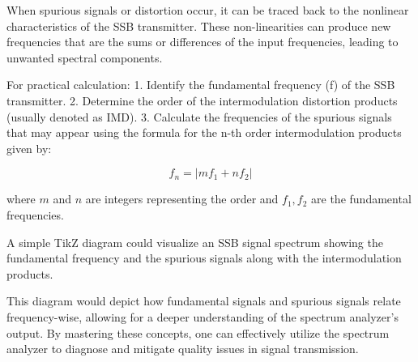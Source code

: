 When spurious signals or distortion occur, it can be traced back to the nonlinear characteristics of the SSB transmitter. These non-linearities can produce new frequencies that are the sums or differences of the input frequencies, leading to unwanted spectral components. 

For practical calculation:
1. Identify the fundamental frequency (f) of the SSB transmitter.
2. Determine the order of the intermodulation distortion products (usually denoted as IMD).
3. Calculate the frequencies of the spurious signals that may appear using the formula for the n-th order intermodulation products given by:
   
   \[
   f_{n} = |mf_1 + nf_2|
   \]

   where \( m \) and \( n \) are integers representing the order and \( f_1, f_2 \) are the fundamental frequencies.

A simple TikZ diagram could visualize an SSB signal spectrum showing the fundamental frequency and the spurious signals along with the intermodulation products.



This diagram would depict how fundamental signals and spurious signals relate frequency-wise, allowing for a deeper understanding of the spectrum analyzer's output. By mastering these concepts, one can effectively utilize the spectrum analyzer to diagnose and mitigate quality issues in signal transmission.
